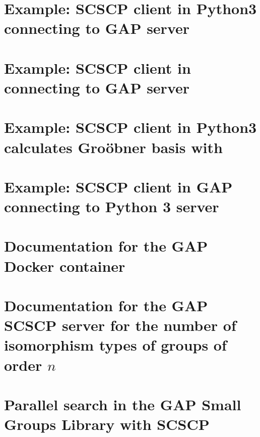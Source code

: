 \documentclass{deliverablereport}
\begin{document}
\section{Example: SCSCP client in Python3 connecting to GAP server}\label{python3-to-GAP}


\section{Example: SCSCP client in \Sage connecting to GAP server}\label{SageMath-to-GAP}


\section{Example: SCSCP client in Python3 calculates Gro\"obner basis with \Singular}\label{Python3sympy-to-GAP-Singular}



\section{Example: SCSCP client in GAP connecting to Python 3 server}\label{GAP-to-Python3numpy}


\section{Documentation for the GAP Docker container}\label{SCSCP-with-GAP-docker}


\section{Documentation for the GAP SCSCP server for the number of isomorphism types of groups of order $n$}\label{Gnu-SCSCP-server}


\section{Parallel search in the GAP Small Groups Library with SCSCP}
\label{Parallel-GAP-SCSCP}

\end{document}
